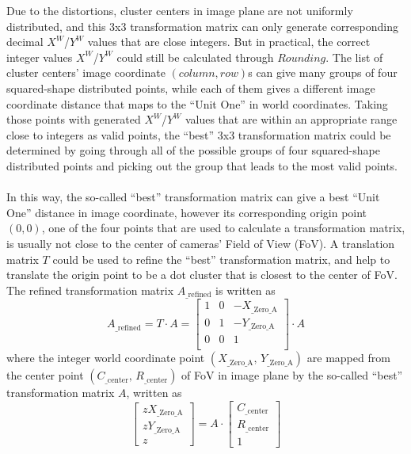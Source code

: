Due to the distortions, cluster centers in image plane are not uniformly distributed, and this 3x3 transformation matrix can only generate corresponding decimal \(X^W\)/\(Y^W\) values that are close integers. But in practical, the correct integer values \(X^W\)/\(Y^W\) could still be calculated through \(Rounding\). The list of cluster centers' image coordinate \((column, row)\)s can give many groups of four squared-shape distributed points, while each of them gives a different image coordinate distance that maps to the \enquote{Unit One} in world coordinates. Taking those points with generated \(X^W\)/\(Y^W\) values that are within an appropriate range close to integers as valid points, the \enquote{best} 3x3 transformation matrix could be determined by going through all of the possible groups of four squared-shape distributed points and picking out the group that leads to the most valid points.%
\\\\%
In this way, the so-called \enquote{best} transformation matrix can give a best \enquote{Unit One} distance in image coordinate, however its corresponding origin point \((0, 0)\), one of the four points that are used to calculate a transformation matrix, is usually not close to the center of cameras' Field of View (FoV). A translation matrix \(T\) could be used to refine the \enquote{best} transformation matrix, and help to translate the origin point to be a dot cluster that is closest to the center of FoV. The refined transformation matrix \(A_{\text{\_refined}}\) is written as%
%
\begin{equation}
%
A_{\text{\_refined}}%
= %
T \cdot A %
= %
\begin{bmatrix} 
1 & 0 & -X_{\text{\_Zero\_A}} \\%
0 & 1 & -Y_{\text{\_Zero\_A}} \\%
0 & 0 &   1 \\%
\end{bmatrix}%
\cdot A%
%
\end{equation}%
%
where the integer world coordinate point \((X_{\text{\_Zero\_A}}, \, Y_{\text{\_Zero\_A}})\) are mapped from the center point \((C_{\text{\_center}}, \, R_{\text{\_center}})\) of FoV in image plane by the so-called \enquote{best} transformation matrix \(A\), written as%
%
\begin{equation}
%
\left[ \begin{array}{c} %
zX_{\text{\_Zero\_A}} \\ zY_{\text{\_Zero\_A}} \\ z \end{array} \right] %
= %
A\cdot \left[ \begin{array}{c} %
C_{\text{\_center}} \\ R_{\text{\_center}} \\ 1 \end{array} \right] %
%
\end{equation}%
